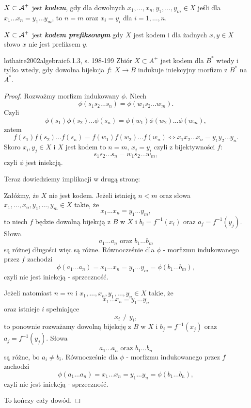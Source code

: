 \begin{definition}{}{}
  $X \subset \operatorname{\mathcal{A}}^+$ jest {\bf\textit{kodem}}, gdy dla dowolnych $x_1, \ldots, x_n, y_1, \ldots, y_m \in X$ jeśli dla $x_1 \ldots x_n = y_1 \ldots y_m$, to $n = m$ oraz $x_i = y_i$ dla $i = 1, \ldots, n$.
\end{definition}

\begin{definition}{}{}
  $X \subset \operatorname{\mathcal{A}}^+$ jest {\bf\textit{kodem prefiksowym}} gdy $X$ jest kodem i dla żadnych $x, y \in X$ słowo $x$ nie jest prefiksem $y$.
\end{definition}

\begin{problem}{lothaire2002algebraic}{6.1.3, s. 198-199}
  Zbiór $X \subset A^{+}$ jest kodem dla $B^{*}$ wtedy i tylko wtedy, gdy dowolna bijekcja $f:\ X \rightarrow B$ indukuje iniekcyjny morfizm z $B^{*}$ na $A^{*}$.
\end{problem}

\begin{proof}
Rozważmy morfizm indukowany $\phi$. Niech
$$\phi(s_1s_2\dots s_n) = \phi(w_1s_2\dots w_m).$$ 
Czyli
$$\phi(s_1)\phi(s_2)\dots \phi(s_n) = \phi(w_1)\phi(w_2)\dots \phi(w_m),$$
zatem
$$f(s_1)f(s_2)\dots f(s_n) =  f(w_1)f(w_2)\dots f(w_n) \Leftrightarrow x_1 x_2\dots x_n = y_1 y_2 \dots y_n.$$
Skoro $x_i, y_j \in X$ i $X$ jest kodem to $n = m$, $x_i = y_i$ czyli z bijektywności $f$:
$$s_1s_2\dots s_n = w_1s_2\dots w_m,$$
czyli $\phi$ jest iniekcją.

Teraz dowiedziemy implikacji w drugą stronę:

Załóżmy, że $X$ nie jest kodem. Jeżeli istnieją $n < m$ oraz słowa $x_1, \dots, x_n, y_1, \dots, y_m \in X$ takie, że 
$$x_1 \dots x_n = y_1 \dots y_m,$$ 
to niech $f$ będzie dowolną bijekcją z $B$ w $X$ i $b_i = f^{-1}(x_i)$ oraz $a_j = f^{-1}(y_j)$. Słowa
$$a_1 \dots a_n \text{ oraz } b_1 \dots b_m$$
są różnej długości więc są różne. Równocześnie dla $\phi$ - morfizmu indukowanego przez $f$ zachodzi
$$\phi(a_1 \dots a_n) = x_1 \dots x_n = y_1 \dots y_m = \phi(b_1 \dots b_m),$$
czyli nie jest iniekcją - sprzeczność.

Jeżeli natomiast $n=m$ i $x_1, \dots, x_n, y_1, \dots, y_n \in X$ takie, że
$$x_1 \dots x_n = y_1 \dots y_n$$ 
oraz istnieje $i$ spełniające 
$$x_i \neq y_i,$$
to ponownie rozważamy dowolną bijekcję z $B$ w $X$ i $b_j = f^{-1}(x_j)$ oraz $a_j = f^{-1}(y_j)$. Słowa
$$a_1 \dots a_n \text{ oraz } b_1 \dots b_n$$
są różne, bo $a_i \neq b_i$. Równocześnie dla $\phi$ - morfizmu indukowanego przez $f$ zachodzi
$$\phi(a_1 \dots a_n) = x_1 \dots x_n = y_1 \dots y_n = \phi(b_1 \dots b_n),$$
czyli nie jest iniekcją - sprzeczność.

To kończy cały dowód.
\end{proof}

